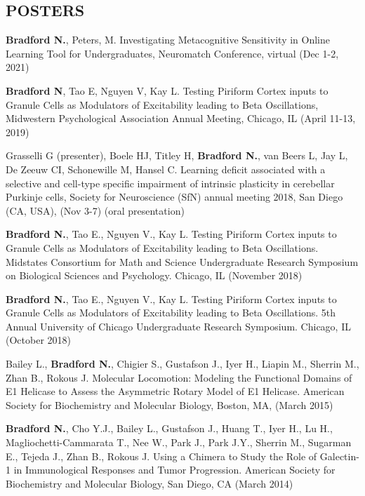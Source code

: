 \documentclass[margin, 10pt]{res} %
\begin{document}
\begin{resume}

\section{POSTERS}
\textbf{Bradford N.}, Peters, M. Investigating Metacognitive Sensitivity in Online Learning Tool for Undergraduates, Neuromatch Conference, virtual (Dec 1-2, 2021)

\textbf{Bradford N}, Tao E, Nguyen V, Kay L. Testing Piriform Cortex inputs to Granule Cells as Modulators of Excitability leading to Beta Oscillations, Midwestern Psychological Association Annual Meeting, Chicago, IL (April 11-13, 2019)

Grasselli G (presenter), Boele HJ, Titley H, \textbf{Bradford N.}, van Beers L, Jay L, De Zeeuw CI, Schonewille M, Hansel C. Learning deficit associated with a selective and cell-type specific impairment of intrinsic plasticity in cerebellar Purkinje cells, Society for Neuroscience (SfN) annual meeting 2018, San Diego (CA, USA), (Nov 3-7) (oral presentation)

\textbf{Bradford N.}, Tao E., Nguyen V., Kay L. Testing Piriform Cortex inputs to Granule Cells as Modulators of Excitability leading to Beta Oscillations. Midstates Consortium for Math and Science Undergraduate Research Symposium on Biological Sciences and Psychology. Chicago, IL (November 2018) 

\textbf{Bradford N.}, Tao E., Nguyen V., Kay L. Testing Piriform Cortex inputs to Granule Cells as Modulators of Excitability leading to Beta Oscillations. 5th Annual University of Chicago Undergraduate Research Symposium. Chicago, IL (October 2018)


Bailey L., \textbf{Bradford N.}, Chigier S., Gustafson J., Iyer H., Liapin M., Sherrin M., Zhan B., Rokous J. Molecular Locomotion: Modeling the Functional Domains of E1 Helicase to Assess the Asymmetric Rotary Model of E1 Helicase. American Society for Biochemistry and Molecular Biology, Boston, MA, (March 2015)

\textbf{Bradford N.}, Cho Y.J., Bailey L., Gustafson J., Huang T., Iyer H., Lu H., Magliochetti-Cammarata T., Nee W., Park J., Park J.Y., Sherrin M., Sugarman E., Tejeda J., Zhan B., Rokous J. Using a Chimera to Study the Role of Galectin-1 in Immunological Responses and Tumor Progression. American Society for Biochemistry and Molecular Biology, San Diego, CA (March 2014)


\end{resume}
\end{document}
